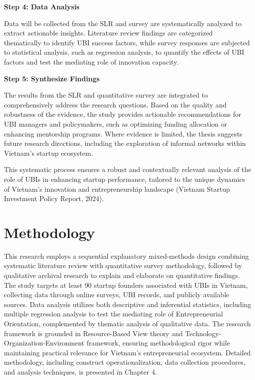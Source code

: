 \documentclass[../Main.tex]{subfiles}
\begin{document}
	\begin{center}
		\begin{minipage}[c]{\textwidth}
		\vspace*{\fill}

	\textbf{Step 4: Data Analysis}

	Data will be collected from the SLR and survey are systematically analyzed to extract actionable insights. Literature review findings are categorized thematically to identify UBI success factors, while survey responses are subjected to statistical analysis, such as regression analysis, to quantify the effects of UBI factors and test the mediating role of innovation capacity.

	\textbf{Step 5: Synthesize Findings}

	The results from the SLR and quantitative survey are integrated to comprehensively address the research questions. Based on the quality and robustness of the evidence, the study provides actionable recommendations for UBI managers and policymakers, such as optimizing funding allocation or enhancing mentorship programs. Where evidence is limited, the thesis suggests future research directions, including the exploration of informal networks within Vietnam's startup ecosystem.

	This systematic process ensures a robust and contextually relevant analysis of the role of UBIs in enhancing startup performance, tailored to the unique dynamics of Vietnam's innovation and entrepreneurship landscape (Vietnam Startup Investment Policy Report, 2024).

		\end{minipage}
	\end{center}

	\section{Methodology}
	\label{section:1.5_Methodology}
	
	This research employs a sequential explanatory mixed-methods design combining systematic literature review with quantitative survey methodology, followed by qualitative archival research to explain and elaborate on quantitative findings. The study targets at least 90 startup founders associated with UBIs in Vietnam, collecting data through online surveys, UBI records, and publicly available sources. Data analysis utilizes both descriptive and inferential statistics, including multiple regression analysis to test the mediating role of Entrepreneurial Orientation, complemented by thematic analysis of qualitative data. The research framework is grounded in Resource-Based View theory and Technology-Organization-Environment framework, ensuring methodological rigor while maintaining practical relevance for Vietnam's entrepreneurial ecosystem. Detailed methodology, including construct operationalization, data collection procedures, and analysis techniques, is presented in Chapter 4.
\end{document}
